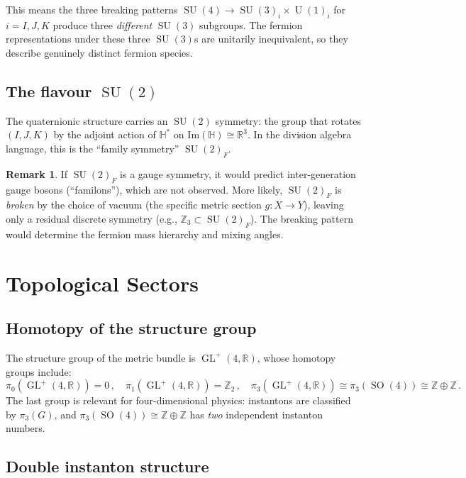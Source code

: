\documentclass[12pt,a4paper]{article}
\theoremstyle{definition}
\newtheorem{remark}[theorem]{Remark}
\newcommand{\GL}{\operatorname{GL}}
\newcommand{\SO}{\operatorname{SO}}
\newcommand{\SU}{\operatorname{SU}}
\newcommand{\U}{\operatorname{U}}
\newcommand{\R}{\mathbb{R}}
\newcommand{\Z}{\mathbb{Z}}
\newcommand{\HH}{\mathbb{H}}
\begin{document}
This means the three breaking patterns $\SU(4) \to \SU(3)_i \times \U(1)_i$ for $i = I, J, K$ produce three \emph{different} $\SU(3)$ subgroups.
The fermion representations under these three $\SU(3)$s are unitarily inequivalent, so they describe genuinely distinct fermion species.

\subsection{The flavour $\SU(2)$}

The quaternionic structure carries an $\SU(2)$ symmetry: the group that rotates $(I, J, K)$ by the adjoint action of $\HH^*$ on $\mathrm{Im}(\HH) \cong \R^3$.
In the division algebra language, this is the ``family symmetry'' $\SU(2)_F$.

\begin{remark}
If $\SU(2)_F$ is a gauge symmetry, it would predict inter-generation gauge bosons (``familons''), which are not observed.
More likely, $\SU(2)_F$ is \emph{broken} by the choice of vacuum (the specific metric section $g\colon X \to Y$), leaving only a residual discrete symmetry (e.g., $\Z_3 \subset \SU(2)_F$).
The breaking pattern would determine the fermion mass hierarchy and mixing angles.
\end{remark}


\section{Topological Sectors}
\label{sec:topological}

\subsection{Homotopy of the structure group}

The structure group of the metric bundle is $\GL^+(4,\R)$, whose homotopy groups include:
\begin{equation}
\pi_0(\GL^+(4,\R)) = 0\,,\quad \pi_1(\GL^+(4,\R)) = \Z_2\,,\quad \pi_3(\GL^+(4,\R)) \cong \pi_3(\SO(4)) \cong \Z \oplus \Z\,.
\end{equation}
The last group is relevant for four-dimensional physics: instantons are classified by $\pi_3(G)$, and $\pi_3(\SO(4)) \cong \Z \oplus \Z$ has \emph{two} independent instanton numbers.

\subsection{Double instanton structure}
\end{document}
